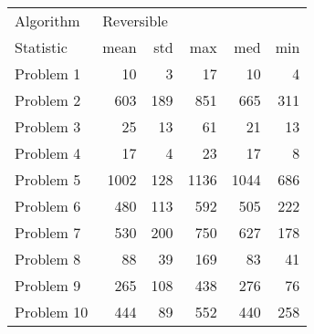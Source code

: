\begin{tabular}{lrrrrr}
\toprule
Algorithm & \multicolumn{5}{l}{Reversible} \\
Statistic &       mean &  std &   max &   med &  min \\
\midrule
Problem 1  &         10 &    3 &    17 &    10 &    4 \\
Problem 2  &        603 &  189 &   851 &   665 &  311 \\
Problem 3  &         25 &   13 &    61 &    21 &   13 \\
Problem 4  &         17 &    4 &    23 &    17 &    8 \\
Problem 5  &       1002 &  128 &  1136 &  1044 &  686 \\
Problem 6  &        480 &  113 &   592 &   505 &  222 \\
Problem 7  &        530 &  200 &   750 &   627 &  178 \\
Problem 8  &         88 &   39 &   169 &    83 &   41 \\
Problem 9  &        265 &  108 &   438 &   276 &   76 \\
Problem 10 &        444 &   89 &   552 &   440 &  258 \\
\bottomrule
\end{tabular}
